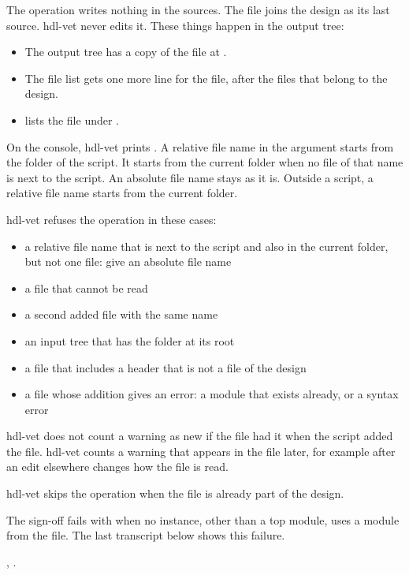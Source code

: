 \begin{entry}{}
\item[Writes] The operation writes nothing in the sources. The file joins the design as
  its last source. hdl-vet never edits it. These things happen in the output tree:
  \begin{itemize}
  \item The output tree has a copy of the file at .
  \item The file list gets one more line for the file, after the files that belong to the
    design.
  \item {} lists the file under .
  \end{itemize}
  On the console, hdl-vet prints . A relative file name
  in the argument  starts from the folder of the script. It starts from the
  current folder when no file of that name is next to the script. An absolute file name
  stays as it is. Outside a script, a relative file name starts from the current folder.
\item[Refused] hdl-vet refuses the operation in these cases:
  \begin{itemize}
  \item a relative file name that is next to the script and also in the current folder, but
    not one file: give an absolute file name
  \item a file that cannot be read
  \item a second added file with the same name
  \item an input tree that has the folder  at its root
  \item a file that includes a header that is not a file of the design
  \item a file whose addition gives an error: a module that exists already, or a syntax
    error
  \end{itemize}
  hdl-vet does not count a warning as new if the file had it when the script added the
  file. hdl-vet counts a warning that appears in the file later, for example after an
  edit elsewhere changes how the file is read.
\item[Again] hdl-vet skips the operation when the file is already part of the design.
\item[Sign-off] The sign-off fails with  when no instance, other than a top module, uses a module
  from the file. The last transcript below shows this failure.
\item[Example] , .
\end{entry}

